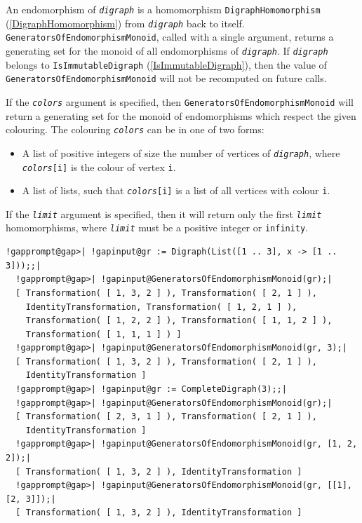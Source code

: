 \documentclass[a4paper,11pt]{report}
\begin{document}
{{{ An endomorphism of \mbox{\texttt{\mdseries\slshape digraph}} is a homomorphism \texttt{DigraphHomomorphism} (\ref{DigraphHomomorphism}) from \mbox{\texttt{\mdseries\slshape digraph}} back to itself. \texttt{GeneratorsOfEndomorphismMonoid}, called with a single argument, returns a generating set for the monoid of
all endomorphisms of \mbox{\texttt{\mdseries\slshape digraph}}. If \mbox{\texttt{\mdseries\slshape digraph}} belongs to \texttt{IsImmutableDigraph} (\ref{IsImmutableDigraph}), then the value of \texttt{GeneratorsOfEndomorphismMonoid} will not be recomputed on future calls.

 If the \mbox{\texttt{\mdseries\slshape colors}} argument is specified, then \texttt{GeneratorsOfEndomorphismMonoid} will return a generating set for the monoid of endomorphisms which respect the
given colouring. The colouring \mbox{\texttt{\mdseries\slshape colors}} can be in one of two forms: 

 
\begin{itemize}
\item  A list of positive integers of size the number of vertices of \mbox{\texttt{\mdseries\slshape digraph}}, where \mbox{\texttt{\mdseries\slshape colors}}\texttt{[i]} is the colour of vertex \texttt{i}. 
\item  A list of lists, such that \mbox{\texttt{\mdseries\slshape colors}}\texttt{[i]} is a list of all vertices with colour \texttt{i}. 
\end{itemize}
 If the \mbox{\texttt{\mdseries\slshape limit}} argument is specified, then it will return only the first \mbox{\texttt{\mdseries\slshape limit}} homomorphisms, where \mbox{\texttt{\mdseries\slshape limit}} must be a positive integer or \texttt{infinity}. 

 
\begin{Verbatim}[commandchars=!@|,fontsize=\small,frame=single,label=Example]
  !gapprompt@gap>| !gapinput@gr := Digraph(List([1 .. 3], x -> [1 .. 3]));;|
  !gapprompt@gap>| !gapinput@GeneratorsOfEndomorphismMonoid(gr);|
  [ Transformation( [ 1, 3, 2 ] ), Transformation( [ 2, 1 ] ),
    IdentityTransformation, Transformation( [ 1, 2, 1 ] ),
    Transformation( [ 1, 2, 2 ] ), Transformation( [ 1, 1, 2 ] ),
    Transformation( [ 1, 1, 1 ] ) ]
  !gapprompt@gap>| !gapinput@GeneratorsOfEndomorphismMonoid(gr, 3);|
  [ Transformation( [ 1, 3, 2 ] ), Transformation( [ 2, 1 ] ),
    IdentityTransformation ]
  !gapprompt@gap>| !gapinput@gr := CompleteDigraph(3);;|
  !gapprompt@gap>| !gapinput@GeneratorsOfEndomorphismMonoid(gr);|
  [ Transformation( [ 2, 3, 1 ] ), Transformation( [ 2, 1 ] ),
    IdentityTransformation ]
  !gapprompt@gap>| !gapinput@GeneratorsOfEndomorphismMonoid(gr, [1, 2, 2]);|
  [ Transformation( [ 1, 3, 2 ] ), IdentityTransformation ]
  !gapprompt@gap>| !gapinput@GeneratorsOfEndomorphismMonoid(gr, [[1], [2, 3]]);|
  [ Transformation( [ 1, 3, 2 ] ), IdentityTransformation ]
\end{Verbatim}
 }

}}
\end{document}
